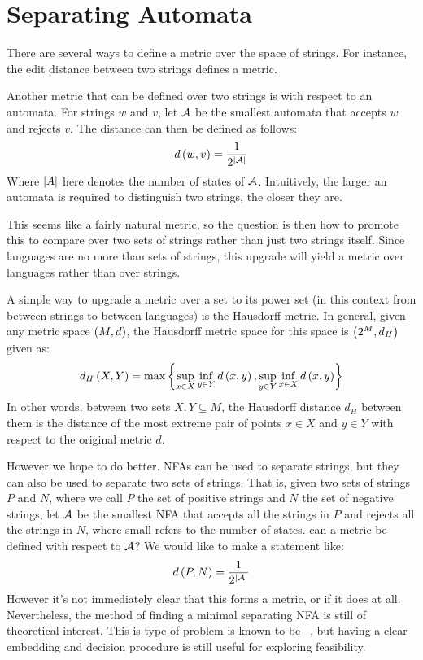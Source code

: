 
\section{Separating Automata}

There are several ways to define a metric over the space of strings.
For instance,
the edit distance between two strings defines a metric.

Another metric that can be defined over two strings is with respect to an
automata.
For strings \(w\) and \(v\),
let \(\mathcal{A}\) be the smallest automata that accepts \(w\) and rejects
\(v\).
The distance can then be defined as follows:
\begin{align*}
  d\left(w, v\right) = \frac{1}{2^{\left\lvert\mathcal{A}\right\rvert}}
\end{align*}
Where \(\left\lvert A\right\rvert\) here denotes the number of states of \(\mathcal{A}\).
Intuitively, the larger an automata is required to distinguish two strings,
the closer they are.


This seems like a fairly natural metric,
so the question is then how to promote this to
compare over two sets of strings rather than just two strings itself.
Since languages are no more than sets of strings,
this upgrade will yield a metric over languages rather than over strings.

A simple way to upgrade a metric over a set to its power set
(in this context from between strings to between languages)
is the Hausdorff metric.
In general, given any metric space \(\left(M, d\right)\),
the Hausdorff metric space for this space is \(\left(2^{M}, d_H\right)\)
given as:
\begin{align*}
  d_H\left(X, Y\right) =
    \max\left\{\sup_{x \in X} \inf_{y \in Y} d\left(x, y\right),
                \sup_{y \in Y} \inf_{x \in X} d\left(x, y\right)\right\}
\end{align*}
In other words, between two sets \(X, Y \subseteq M\),
the Hausdorff distance \(d_H\) between them is the distance of the most
extreme pair of points \(x \in X\) and \(y \in Y\)
with respect to the original metric \(d\).

However we hope to do better.
NFAs can be used to separate strings, but they can also be used to separate
two sets of strings.
That is, given two sets of strings \(P\) and \(N\),
where we call \(P\) the set of positive strings and \(N\) the set of
negative strings,
let \(\mathcal{A}\) be the smallest NFA that accepts all the strings in \(P\)
and rejects all the strings in \(N\),
where small refers to the number of states.
can a metric be defined with respect to \(\mathcal{A}\)?
We would like to make a statement like:
\begin{align*}
  d\left(P, N\right) = \frac{1}{2^{\left\lvert\mathcal{A}\right\rvert}}
\end{align*}
However it's not immediately clear that this forms a metric,
or if it does at all.
Nevertheless, the method of finding a minimal separating NFA is
still of theoretical interest.
This is type of problem is known to be
~\cite{gold1978complexity},
but having a clear embedding and decision procedure is still useful
for exploring feasibility.


